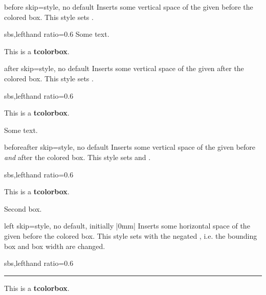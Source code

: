 \begin{docTcbKey}[][doc new and updated={2014-10-10}{2014-12-16}]{before skip}{=}{style, no default}
  Inserts some vertical space of the given  before the colored box.
  This style sets .
\begin{dispExample*}{sbs,lefthand ratio=0.6}
Some text.
\begin{tcolorbox}[before skip=1cm,
    colframe=red!50!white]
  This is a \textbf{tcolorbox}.
\end{tcolorbox}
\end{dispExample*}
\end{docTcbKey}

\begin{docTcbKey}[][doc new and updated={2014-10-10}{2014-12-16}]{after skip}{=}{style, no default}
  Inserts some vertical space of the given  after the colored box.
  This style sets .
\begin{dispExample*}{sbs,lefthand ratio=0.6}
\begin{tcolorbox}[after skip=1cm,
    colframe=red!50!white]
  This is a \textbf{tcolorbox}.
\end{tcolorbox}
Some text.
\end{dispExample*}
\end{docTcbKey}

\begin{docTcbKey}[][doc new=2014-10-10]{beforeafter skip}{=}{style, no default}
  Inserts some vertical space of the given  before \emph{and} after the colored box.
  This style sets  and .
\begin{dispExample*}{sbs,lefthand ratio=0.6}
\begin{tcolorbox}
  This is a \textbf{tcolorbox}.
\end{tcolorbox}
\begin{tcolorbox}
  Second box.
\end{tcolorbox}
\end{dispExample*}
\end{docTcbKey}

\clearpage

\begin{docTcbKey}[][doc new=2014-11-07]{left skip}{=}{style, no default, initially |0mm|}
  Inserts some horizontal space of the given  before the colored box.
  This style sets  with the negated ,
  i.e. the bounding box and box width are changed.
\begin{dispExample*}{sbs,lefthand ratio=0.6}
\noindent\rule{\linewidth}{2pt}

\begin{tcolorbox}[left skip=1cm,
    colframe=red!50!white]
  This is a \textbf{tcolorbox}.
\end{tcolorbox}
\end{dispExample*}
\end{docTcbKey}

